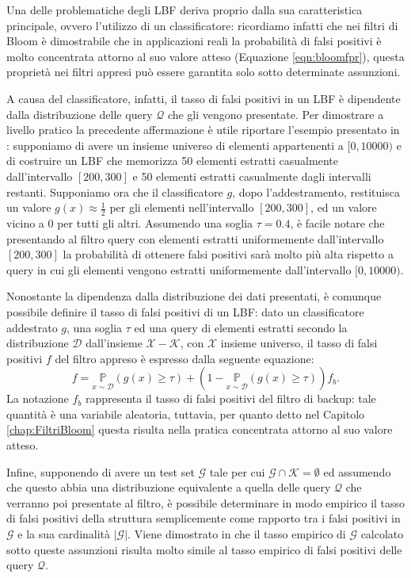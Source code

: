 \documentclass[../../main.tex]{subfiles}
\begin{document}
    
    Una delle problematiche degli LBF deriva proprio dalla sua caratteristica principale, ovvero l'utilizzo di un classificatore: ricordiamo infatti che nei filtri di Bloom è dimostrabile che in applicazioni reali la probabilità di falsi positivi è molto concentrata attorno al suo valore atteso (Equazione \eqref{eqn:bloomfpr}), questa proprietà nei filtri appresi può essere garantita solo sotto determinate assunzioni.

    A causa del classificatore, infatti, il tasso di falsi positivi in un LBF è dipendente dalla distribuzione delle query $\mathcal{Q}$ che gli vengono presentate. Per dimostrare a livello pratico la precedente affermazione è utile riportare l'esempio presentato in \cite{10.5555/3326943.3326986}: supponiamo di avere un insieme universo di elementi appartenenti a $[0, 10000)$ e di costruire un LBF che memorizza 50 elementi estratti casualmente dall'intervallo $[200,300]$ e 50 elementi estratti casualmente dagli intervalli restanti. Supponiamo ora che il classificatore $g$, dopo l'addestramento, restituisca un valore $g(x) \approx \frac{1}{2}$ per gli elementi nell'intervallo $[200,300]$, ed un valore vicino a 0 per tutti gli altri. Assumendo una soglia $\tau = 0.4$, è facile notare che presentando al filtro query con elementi estratti uniformemente dall'intervallo $[200,300]$ la probabilità di ottenere falsi positivi sarà molto più alta rispetto a query in cui gli elementi vengono estratti uniformemente dall'intervallo $[0, 10000)$.

    Nonostante la dipendenza dalla distribuzione dei dati presentati, è comunque possibile definire il tasso di falsi positivi di un LBF: dato un classificatore addestrato $g$, una soglia $\tau$ ed una query di elementi estratti secondo la distribuzione $\mathcal{D}$ dall'insieme $\mathcal{X} - \mathcal{K}$, con $\mathcal{X}$ insieme universo, il tasso di falsi positivi $f$ del filtro appreso è espresso dalla seguente equazione:
    \begin{equation}
        f = \underset{x \sim \mathcal{D}}{\mathbb{P}}(g(x) \geq \tau) + (1 - \underset{x \sim \mathcal{D}}{\mathbb{P}}(g(x) \geq \tau))f_b.
        \label{eqn:LBFFalsiPositivi}
    \end{equation} 
    La notazione $f_b$ rappresenta il tasso di falsi positivi del filtro di backup: tale quantità è una variabile aleatoria, tuttavia, per quanto detto nel Capitolo \ref{chap:FiltriBloom} questa risulta nella pratica concentrata attorno al suo valore atteso.

    Infine, supponendo di avere un test set $\mathcal{G}$ tale per cui $\mathcal{G} \cap \mathcal{K} = \emptyset$ ed assumendo che questo abbia una distribuzione equivalente a quella delle query $\mathcal{Q}$ che verranno poi presentate al filtro, è possibile determinare in modo empirico il tasso di falsi positivi della struttura semplicemente come rapporto tra i falsi positivi in $\mathcal{G}$ e la sua cardinalità $|\mathcal{G}|$. Viene dimostrato in \cite{10.5555/3326943.3326986} che il tasso empirico di $\mathcal{G}$ calcolato sotto queste assunzioni risulta molto simile al tasso empirico di falsi positivi delle query $\mathcal{Q}$. 
    
\end{document}
